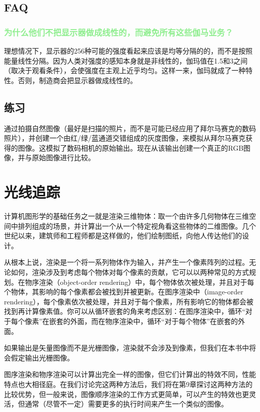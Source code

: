 \documentclass[lang=cn,12pt]{elegantbook}
\begin{document}
\section{FAQ}

\subsection{\textcolor{lightgreen}{为什么他们不把显示器做成线性的，而避免所有这些伽马业务？}}

理想情况下，显示器的256种可能的强度看起来应该是均等分隔的的，而不是按照能量线性分隔。因为人类对强度的感知本身就是非线性的，伽玛值在1.5和3之间（取决于观看条件），会使强度在主观上近乎均匀。这样一来，伽玛就成了一种特性。否则，制造商会把显示器做成线性的。

\section{练习}

通过拍摄自然图像（最好是扫描的照片，而不是可能已经应用了拜尔马赛克的数码照片），并创建一个由红/绿/蓝通道交错组成的灰度图像，来模拟从拜尔马赛克获得的图像。这模拟了数码相机的原始输出。现在从该输出创建一个真正的RGB图像，并与原始图像进行比较。

\chapter{光线追踪}

计算机图形学的基础任务之一就是渲染三维物体：取一个由许多几何物体在三维空间中排列组成的场景，并计算出一个从一个特定视角看这些物体的二维图像。几个世纪以来，建筑师和工程师都是这样做的，他们绘制图纸，向他人传达他们的设计。

从根本上说，渲染是一个将一系列物体作为输入，并产生一个像素阵列的过程。无论如何，渲染涉及到考虑每个物体对每个像素的贡献，它可以以两种常见的方式规划。在物序渲染（object-order rendering）中，每个物体依次被处理，并且对于每个物体，其影响的每个像素都会被找到并被更新。在图序渲染中（image-order rendering），每个像素依次被处理，并且对于每个像素，所有影响它的物体都会被找到再计算像素值。你可以从循环嵌套的角来考虑区别：在图序渲染中，循环“对于每个像素”在嵌套的外面，而在物序渲染中，循环“对于每个物体”在嵌套的外面。

\begin{note}
  如果输出是矢量图像而不是光栅图像，渲染就不会涉及到像素，但我们在本书中将会假定输出光栅图像。
\end{note}

图序渲染和物序渲染可以计算出完全一样的图像，但它们计算出的特效不同，性能特点也大相径庭。在我们讨论完这两种方法后，我们将在第9章探讨这两种方法的比较优势，但一般来说，图像顺序渲染的工作方式更简单，可以产生的特效也更灵活，但通常（尽管不一定）需要更多的执行时间来产生一个类似的图像。
\end{document}
